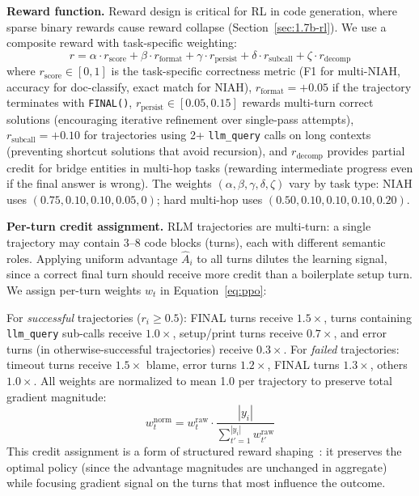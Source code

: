 \documentclass{article}
\begin{document}
\textbf{Reward function.} Reward design is critical for RL in code generation, where sparse binary rewards cause reward collapse (Section~\ref{sec:1.7b-rl}). We use a composite reward with task-specific weighting:
\begin{equation}
r = \alpha \cdot r_\text{score} + \beta \cdot r_\text{format} + \gamma \cdot r_\text{persist} + \delta \cdot r_\text{subcall} + \zeta \cdot r_\text{decomp}
\label{eq:reward}
\end{equation}
where $r_\text{score} \in [0,1]$ is the task-specific correctness metric (F1 for multi-NIAH, accuracy for doc-classify, exact match for NIAH), $r_\text{format} = +0.05$ if the trajectory terminates with \texttt{FINAL()}, $r_\text{persist} \in [0.05, 0.15]$ rewards multi-turn correct solutions (encouraging iterative refinement over single-pass attempts), $r_\text{subcall} = +0.10$ for trajectories using 2+ \texttt{llm\_query} calls on long contexts (preventing shortcut solutions that avoid recursion), and $r_\text{decomp}$ provides partial credit for bridge entities in multi-hop tasks (rewarding intermediate progress even if the final answer is wrong). The weights $(\alpha, \beta, \gamma, \delta, \zeta)$ vary by task type: NIAH uses $(0.75, 0.10, 0.10, 0.05, 0)$; hard multi-hop uses $(0.50, 0.10, 0.10, 0.10, 0.20)$.

\textbf{Per-turn credit assignment.} RLM trajectories are multi-turn: a single trajectory may contain 3--8 code blocks (turns), each with different semantic roles. Applying uniform advantage $\hat{A}_i$ to all turns dilutes the learning signal, since a correct final turn should receive more credit than a boilerplate setup turn. We assign per-turn weights $w_t$ in Equation~\ref{eq:ppo}:

For \emph{successful} trajectories ($r_i \geq 0.5$): FINAL turns receive $1.5{\times}$, turns containing \texttt{llm\_query} sub-calls receive $1.0{\times}$, setup/print turns receive $0.7{\times}$, and error turns (in otherwise-successful trajectories) receive $0.3{\times}$. For \emph{failed} trajectories: timeout turns receive $1.5{\times}$ blame, error turns $1.2{\times}$, FINAL turns $1.3{\times}$, others $1.0{\times}$. All weights are normalized to mean 1.0 per trajectory to preserve total gradient magnitude:
\begin{equation}
w_t^{\text{norm}} = w_t^{\text{raw}} \cdot \frac{|y_i|}{\sum_{t'=1}^{|y_i|} w_{t'}^{\text{raw}}}
\label{eq:credit}
\end{equation}
This credit assignment is a form of structured reward shaping~\cite{schulman2017ppo}: it preserves the optimal policy (since the advantage magnitudes are unchanged in aggregate) while focusing gradient signal on the turns that most influence the outcome.
\end{document}
